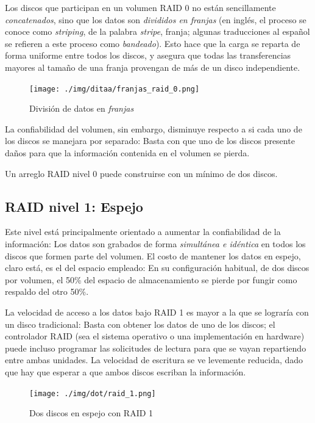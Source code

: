 \documentclass[11pt,fleqn]{book} %
\begin{document}
Los discos que participan en un volumen RAID 0 no están sencillamente
\emph{concatenados}, sino que los datos son \emph{divididos en franjas} (en
inglés, el proceso se conoce como \emph{striping}, de la palabra \emph{stripe},
franja; algunas traducciones al español se refieren a este proceso
como \emph{bandeado}). Esto hace que la carga se reparta de forma
uniforme entre todos los discos, y asegura que todas las
transferencias mayores al tamaño de una franja provengan de más de un
disco independiente.

\begin{figure}[htb]
\centering
\texttt{[image: ./img/ditaa/franjas\_raid\_0.png]}
\caption{\label{FS_FIS_franjas_raid_0}División de datos en \emph{franjas}}
\end{figure}

La confiabilidad del volumen, sin embargo, disminuye
respecto a si cada uno de los discos se manejara por separado: Basta
con que uno de los discos presente daños para que la información
contenida en el volumen se pierda.

Un arreglo RAID nivel 0 puede construirse con un mínimo de dos discos.
\subsection{RAID nivel 1: Espejo}
\label{sec-10-2-2}


Este nivel está principalmente orientado a aumentar la confiabilidad
de la información: Los datos son grabados de forma \emph{simultánea e idéntica} en todos los discos que formen parte del volumen. El costo
de mantener los datos en espejo, claro está, es el del espacio
empleado: En su configuración habitual, de dos discos por volumen, el
50\% del espacio de almacenamiento se pierde por fungir como respaldo
del otro 50\%.

La velocidad de acceso a los datos bajo RAID 1 es mayor a la que se
lograría con un disco tradicional: Basta con obtener los datos de uno
de los discos; el controlador RAID (sea el sistema operativo o una
implementación en hardware) puede incluso programar las solicitudes de
lectura para que se vayan repartiendo entre ambas unidades. La
velocidad de escritura se ve levemente reducida, dado que hay que
esperar a que ambos discos escriban la información.

\begin{figure}[htb]
\centering
\texttt{[image: ./img/dot/raid\_1.png]}
\caption{\label{FS_FIS_raid_1}Dos discos en espejo con RAID 1}
\end{figure}
\end{document}
